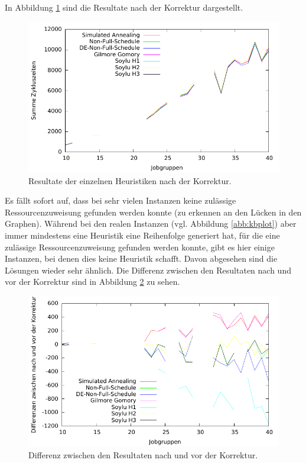 \documentclass{scrreprt}
\begin{document}
In Abbildung \ref{abb:plot} sind die Resultate nach der Korrektur dargestellt.
\begin{figure}
    \begin{center}
        \includegraphics[width=.8\textwidth]{../prog/heuristics/plots/plot.pdf}
    \end{center}
    \caption{
        \label{abb:plot}
        Resultate der einzelnen Heuristiken nach der Korrektur.
    }
\end{figure}
Es fällt sofort auf, dass bei sehr vielen Instanzen keine zulässige Ressourcenzuweisung gefunden werden konnte (zu erkennen an den Lücken in den Graphen).
Während bei den realen Instanzen (vgl. Abbildung \ref{abb:kbplot}) aber immer mindestens eine Heuristik eine Reihenfolge generiert hat, 
für die eine zulässige Ressourcenzuweisung gefunden werden konnte, gibt es hier einige Instanzen, bei denen dies keine Heuristik schafft.
Davon abgesehen sind die Lösungen wieder sehr ähnlich.
Die Differenz zwischen den Resultaten nach und vor der Korrektur sind in Abbildung \ref{abb:diffplot} zu sehen.
\begin{figure}
    \begin{center}
        \includegraphics[width=.8\textwidth]{../prog/heuristics/plots/diffplot.pdf}
    \end{center}
    \caption{
        \label{abb:diffplot}
        Differenz zwischen den Resultaten nach und vor der Korrektur.
    }
\end{figure}
\end{document}
